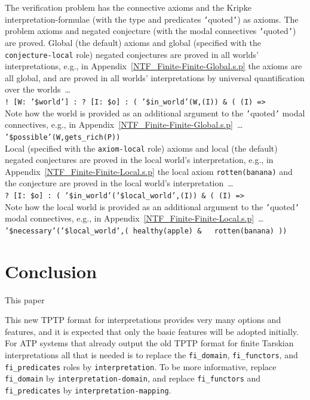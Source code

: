 \documentclass{easychair}
\newcommand{\smalltt}[1]{\small \texttt{#1}}
\begin{document}
The verification problem has the connective axioms and the Kripke interpretation-formulae 
(with the type and predicates {\tt '}quoted{\tt '}) as axioms.
The problem axioms and negated conjecture (with the modal connectives {\tt '}quoted{\tt '})
are proved.
Global (the default) axioms and global (specified with the {\tt conjecture-local} role)
negated conjectures are proved in all worlds' interpretations, e.g., in 
Appendix~\ref{NTF_Finite-Finite-Global.s.p} the axioms are all global, and are proved in
all worlds' interpretations by universal quantification over the worlds~\ldots \\
\hspace*{0.5cm}\smalltt{! [W: '\$world'] : ? [I: \$o] : ( '\$in\_world'(W,(I)) \& ( (I) =>} \\
Note how the world is provided as an additional argument to the {\tt '}quoted{\tt '} modal
connectives, e.g., in Appendix~\ref{NTF_Finite-Finite-Global.s.p}~\ldots \\
\hspace*{0.5cm}\smalltt{’\$possible’(W,gets\_rich(P))} \\
Local (specified with the {\tt axiom-local} role) axioms and local (the default) negated
conjectures are proved in the local world's interpretation, e.g., 
in Appendix~\ref{NTF_Finite-Finite-Local.s.p} the local axiom {\tt rotten(banana)} and
the conjecture are proved in the local world's interpretation~\ldots \\
\hspace*{0.5cm}\smalltt{? [I: \$o] : ( '\$in\_world'('\$local\_world',(I)) \& ( (I) =>} \\
Note how the local world is provided as an additional argument to the {\tt '}quoted{\tt '} 
modal connectives, e.g., in Appendix~\ref{NTF_Finite-Finite-Local.s.p}~\ldots \\
\hspace*{0.5cm}\smalltt{'\$necessary'('\$local\_world',( healthy(apple) \& ~ rotten(banana) ))}

\section{Conclusion}
\label{Conclusion}

This paper 

This new TPTP format for interpretations provides very many options and features, and it is
expected that only the basic features will be adopted initially. 
For ATP systems that already output the old TPTP format for finite Tarskian interpretations
all that is needed is to replace the {\tt fi\_domain}, {\tt fi\_functors}, and {\tt fi\_predicates}
roles by {\tt interpretation}. 
To be more informative, replace {\tt fi\_domain} by {\tt interpretation-domain}, and replace
{\tt fi\_functors} and {\tt fi\_predicates} by {\tt interpretation-mapping}.
\end{document}
